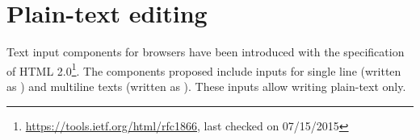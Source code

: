\section{Plain-text editing}

Text input components for browsers have been introduced with the specification of HTML 2.0\footnote{\url{https://tools.ietf.org/html/rfc1866}, last checked on 07/15/2015}. The components proposed include inputs for single line (written as ) and multiline texts (written as ). These inputs allow writing plain-text only.
